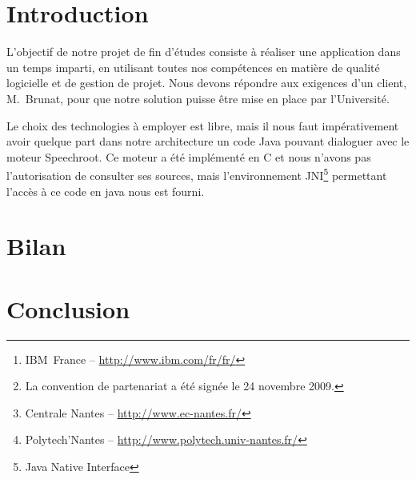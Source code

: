 \documentclass[a4paper,11pt]{report}
\begin{document}


\begin{abstract}
Le projet de fin d'études consiste en la mise en \oe{}uvre de compétences acquises au cours des deux années de Master.
Chaque groupe de quatre à six étudiants travaille sur un sujet de projet différent.
Le déroulement du projet doit respecter les étapes de création d'un véritable projet open-source et doit en conséquent tirer au maximum profit des différents outils de gestion de projet.

Le projet que nous avons choisi de réaliser a été proposé par l'entreprise IBM~France\footnote{IBM~France -- \url{http://www.ibm.com/fr/fr/}}.
Il s'agit du fruit d'un partenariat entre IBM et l'Université de Nantes\footnote{La convention de partenariat a été signée le 24 novembre 2009.} afin de faciliter la scolarisation des étudiants malentendants.
En effet, à l'aide d'un logiciel disposant d'un moteur de reconnaissance vocale (en l'occurrence le moteur ``Speechroot'' d'IBM), l'étudiant aurait accès au sous-titrage du discours de l'enseignant de manière immédiate.
Ce projet diffère légèrement des autres par le fait que nous devons travailler en collaboration avec des groupes d'étudiants de d'autres écoles.
L'équipe d'IBM, composée de Béatrice~Martin et de sa collègue Christel~Amato, technicienne ayant une très importante expérience dans le domaine de la reconnaissance vocale, se charge de la coordination entre les trois groupes d'étudiants (celui de Centrale\footnote{Centrale Nantes -- \url{http://www.ec-nantes.fr/}}, de Polytech'\footnote{Polytech'Nantes -- \url{http://www.polytech.univ-nantes.fr/}} et nous-mêmes) et Stéphane~Brunat du Relai Handicap.
\end{abstract}

\tableofcontents


\chapter*{Introduction}
L'objectif de notre projet de fin d'études consiste à réaliser une application dans un temps imparti, en utilisant toutes nos compétences en matière de qualité logicielle et de gestion de projet.
Nous devons répondre aux exigences d'un client, M.~Brunat, pour que notre solution puisse être mise en place par l'Université.

Le choix des technologies à employer est libre, mais il nous faut im\-pé\-ra\-ti\-ve\-ment avoir quelque part dans notre architecture un code Java pouvant dialoguer avec le moteur Speechroot.
Ce moteur a été implémenté en C et nous n'avons pas l'autorisation de consulter ses sources, mais l'environnement JNI\footnote{Java Native Interface} permettant l'accès à ce code en java nous est fourni.









\chapter{Bilan}


\chapter{Conclusion}


\listoffigures   


\end{document}
